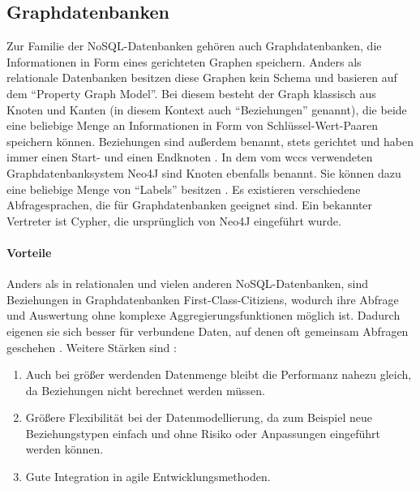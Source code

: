 \subsection{Graphdatenbanken}
    Zur Familie der NoSQL-Datenbanken gehören auch Graphdatenbanken,
    die Informationen in Form eines gerichteten Graphen speichern.
    Anders als relationale Datenbanken besitzen diese Graphen kein Schema
    und basieren auf dem "`Property Graph Model"'.
    Bei diesem besteht der Graph klassisch aus Knoten und Kanten
    (in diesem Kontext auch "`Beziehungen"' genannt),
    die beide eine beliebige Menge an Informationen in Form
    von Schlüssel-Wert-Paaren speichern können.
    Beziehungen sind außerdem benannt, stets gerichtet und haben immer einen
    Start- und einen Endknoten
    \cite[Kapitel 1]{robinson:graphdatabases}.
    In dem vom \gls{wccs} verwendeten Graphdatenbanksystem Neo4J sind Knoten ebenfalls benannt.
    Sie können dazu eine beliebige Menge von "`Labels"' besitzen
    \cite[Kapitel 1.2.1.4]{neo4j:documentation}.
    Es existieren verschiedene Abfragesprachen, die für Graphdatenbanken geeignet sind.
    Ein bekannter Vertreter ist Cypher, die ursprünglich von Neo4J \cite[Kapitel 3]{neo4j:documentation} eingeführt wurde.

    \paragraph{Vorteile}
    Anders als in relationalen und vielen anderen NoSQL-Datenbanken,
    sind Beziehungen in Graphdatenbanken First-Class-Citiziens,
    wodurch ihre Abfrage und Auswertung ohne komplexe Aggregierungsfunktionen möglich ist.
    Dadurch eigenen sie sich besser für verbundene Daten,
    auf denen oft gemeinsam Abfragen geschehen
    \cite[Kapitel 2]{robinson:graphdatabases}
    \cite[Kapitel 11.2]{sadalage:nosql}.
    Weitere Stärken sind
    \cite[Kapitel 1]{robinson:graphdatabases}
    \cite[Kapitel 11.1]{sadalage:nosql}:
    
    \begin{enumerate}
        \item   Auch bei größer werdenden Datenmenge bleibt die Performanz nahezu gleich,
                da Beziehungen nicht berechnet werden müssen.
        \item   Größere Flexibilität bei der Datenmodellierung, da zum Beispiel
                neue Beziehungstypen einfach und ohne Risiko oder Anpassungen eingeführt werden können.
        \item   Gute Integration in agile Entwicklungsmethoden.
    \end{enumerate}
    

